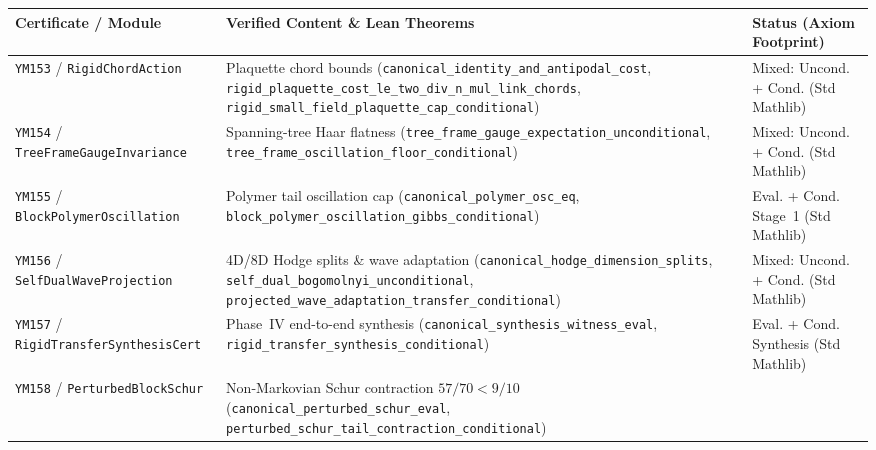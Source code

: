 \documentclass[11pt,a4paper]{article}
\begin{document}
\begin{table}[ht]
\centering
\footnotesize
\setlength{\tabcolsep}{4pt}
\begin{tabular}{@{}p{4.3cm}p{6.6cm}p{3.4cm}@{}}
\hline
\textbf{Certificate / Module} & \textbf{Verified Content \& Lean Theorems} & \textbf{Status (Axiom Footprint)} \\
\hline
\texttt{YM153} / \texttt{RigidChord\allowbreak Action} &
Plaquette chord bounds (\texttt{canonical\_\allowbreak identity\_\allowbreak and\_\allowbreak antipodal\_\allowbreak cost}, \texttt{rigid\_\allowbreak plaquette\_\allowbreak cost\_\allowbreak le\_\allowbreak two\_\allowbreak div\_\allowbreak n\_\allowbreak mul\_\allowbreak link\_\allowbreak chords}, \texttt{rigid\_\allowbreak small\_\allowbreak field\_\allowbreak plaquette\_\allowbreak cap\_\allowbreak conditional}) &
Mixed: Uncond. + Cond. (Std Mathlib) \\
\texttt{YM154} / \texttt{TreeFrame\allowbreak GaugeInvariance} &
Spanning-tree Haar flatness (\texttt{tree\_\allowbreak frame\_\allowbreak gauge\_\allowbreak expectation\_\allowbreak unconditional}, \texttt{tree\_\allowbreak frame\_\allowbreak oscillation\_\allowbreak floor\_\allowbreak conditional}) &
Mixed: Uncond. + Cond. (Std Mathlib) \\
\texttt{YM155} / \texttt{BlockPolymer\allowbreak Oscillation} &
Polymer tail oscillation cap (\texttt{canonical\_\allowbreak polymer\_\allowbreak osc\_\allowbreak eq}, \texttt{block\_\allowbreak polymer\_\allowbreak oscillation\_\allowbreak gibbs\_\allowbreak conditional}) &
Eval. + Cond. Stage~1 (Std Mathlib) \\
\texttt{YM156} / \texttt{SelfDualWave\allowbreak Projection} &
4D/8D Hodge splits \& wave adaptation (\texttt{canonical\_\allowbreak hodge\_\allowbreak dimension\_\allowbreak splits}, \texttt{self\_\allowbreak dual\_\allowbreak bogomolnyi\_\allowbreak unconditional}, \texttt{projected\_\allowbreak wave\_\allowbreak adaptation\_\allowbreak transfer\_\allowbreak conditional}) &
Mixed: Uncond. + Cond. (Std Mathlib) \\
\texttt{YM157} / \texttt{RigidTransfer\allowbreak SynthesisCert} &
Phase~IV end-to-end synthesis (\texttt{canonical\_\allowbreak synthesis\_\allowbreak witness\_\allowbreak eval}, \texttt{rigid\_\allowbreak transfer\_\allowbreak synthesis\_\allowbreak conditional}) &
Eval. + Cond. Synthesis (Std Mathlib) \\
\texttt{YM158} / \texttt{PerturbedBlock\allowbreak Schur} &
Non-Markovian Schur contraction $57/70 < 9/10$ (\texttt{canonical\_\allowbreak perturbed\_\allowbreak schur\_\allowbreak eval}, \texttt{perturbed\_\allowbreak schur\_\allowbreak tail\_\allowbreak contraction\_\allowbreak conditional}) &

\end{tabular}
\end{table}
\end{document}
